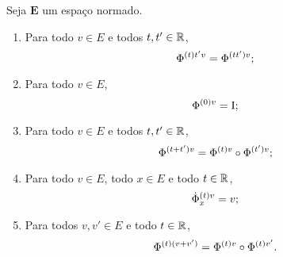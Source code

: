 \begin{proposition}
Seja $\bm E$ um espaço normado.
	\begin{enumerate}
	\item Para todo $v \in E$ e todos $t,t' \in \R$,
		\begin{equation*}
		\fluxo{(t)}{t'v} = \fluxo{(tt')}{v};
		\end{equation*}
	\item Para todo $v \in E$,
		\begin{equation*}
		\fluxo{(0)}{v} = \Id;
		\end{equation*}
	\item Para todo $v \in E$ e todos $t,t' \in \R$,
		\begin{equation*}
		\fluxo{(t+t')}{v} = \fluxo{(t)}{v} \circ \fluxo{(t')}{v};
		\end{equation*}
	\item Para todo $v \in E$, todo $x \in E$ e todo $t \in \R$,
		\begin{equation*}
		\fluxo[\dot]{(t)}{v}_{x} = v;
		\end{equation*}
	\item Para todos $v,v' \in E$ e todo $t \in \R$,
		\begin{equation*}
		\fluxo{(t)}{(v+v')} = \fluxo{(t)}{v} \circ \fluxo{(t)}{v'}.
		\end{equation*}
	\end{enumerate}
\end{proposition}
